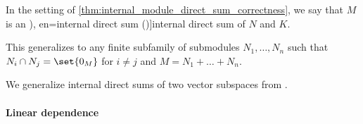 \begin{definition}\label{def:internal_module_direct_sum}\mimprovised
  In the setting of \cref{thm:internal_module_direct_sum_correctness}, we say that \( M \) is an \term[ru=прямая внутренная сумма (\cite[30]{Кострикин2020АлгебраЧасть2}), en=internal direct sum (\cite[60]{Knapp2016BasicAlgebra})]{internal direct sum} of \( N \) and \( K \).

  This generalizes to any finite subfamily of submodules \( N_1, \ldots, N_n \) such that \( N_i \cap N_j = \set{ 0_M } \) for \( i \neq j \) and \( M = N_1 + \ldots + N_n \).
\end{definition}
\begin{comments}
  \item We generalize internal direct sums of two vector subspaces from \cite[60]{Knapp2016BasicAlgebra}.
\end{comments}

\paragraph{Linear dependence}

